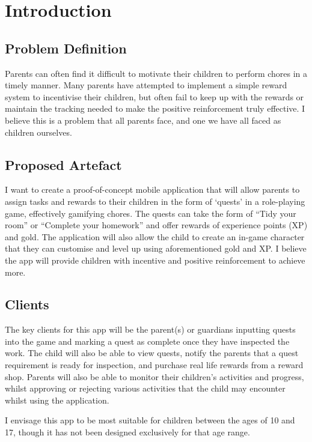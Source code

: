 \chapter{Introduction}
\label{chap:intro}

\section{Problem Definition}
Parents can often find it difficult to motivate their children to perform chores in a timely manner. 
Many parents have attempted to implement a simple reward system to incentivise their children, but often fail to keep up with the rewards or maintain the tracking needed to make the positive reinforcement truly effective.
I believe this is a problem that all parents face, and one we have all faced as children ourselves.  

\section{Proposed Artefact}
I want to create a proof-of-concept mobile application that will allow parents to assign tasks and rewards to their children in the form of `quests' in a role-playing game, effectively gamifying chores. 
The quests can take the form of ``Tidy your room'' or ``Complete your homework'' and offer rewards of experience points (XP) and gold. The application will also allow the child to create an in-game character that they can customise and level up using aforementioned gold and XP.
I believe the app will provide children with incentive and positive reinforcement to achieve more.

\section{Clients}
The key clients for this app will be the parent(s) or guardians inputting quests into the game and marking a quest as complete once they have inspected the work. 
The child will also be able to view quests, notify the parents that a quest requirement is ready for inspection, and purchase real life rewards from a reward shop.
Parents will also be able to monitor their children's activities and progress, whilst approving or rejecting various activities that the child may encounter whilst using the application. 

I envisage this app to be most suitable for children between the ages of 10 and 17, though it has not been designed exclusively for that age range.

